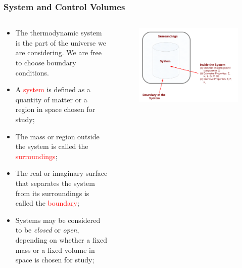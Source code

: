 \documentclass[10pt,compress]{beamer}
\begin{document}
\scriptsize
\begin{frame}
 \frametitle{System and Control Volumes}
  \begin{columns}
    \begin{column}[l]{0.6\linewidth}
      \begin{itemize}%
       \item <2-> The thermodynamic system is the part of the universe we are considering. We are free to choose boundary conditions.
       \item <3-> A \textcolor{red}{system} is defined as a quantity of matter or a region in space chosen for study;
       \item <4-> The mass or region outside the system is called the \textcolor{red}{surroundings};
       \item <5-> The real or imaginary surface that separates the system from its surroundings is called the \textcolor{red}{boundary};
       \item <6-> Systems may be considered to be {\it closed} or {\it open}, depending on whether a fixed mass or a fixed volume in space is chosen for study; 
      \end{itemize}
    \end{column}
    \begin{column}[l]{0.4\linewidth}\scriptsize
      \begin{figure}%
        \begin{center}
          \includegraphics[width=\columnwidth,clip]{./Pics/Fig_SystemDefinition}
        \end{center}
      \end{figure}

\end{column}
\end{columns}
\end{frame}
\end{document}
